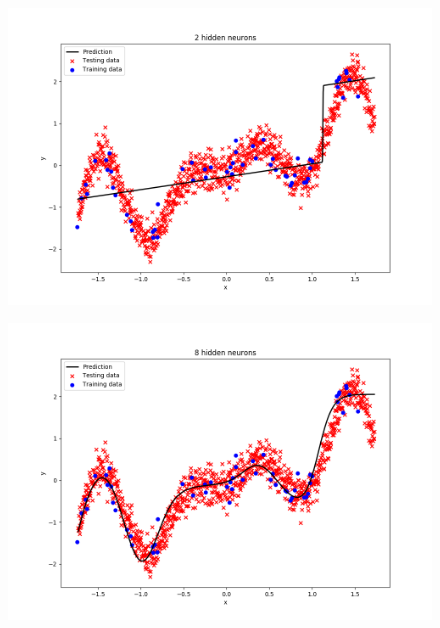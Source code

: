 \documentclass[a4paper]{article}
\begin{document}
\begin{enumerate}[label=(\alph*)]
\begin{figure}[htp]
\begin{minipage}{0.4\textwidth}
  \includegraphics[scale=0.35]{plots/11a_2.png}
  \label{plot_simple_nh2}
\end{minipage}
\hfill
\begin{minipage}{0.4\textwidth}
  \includegraphics[scale=0.35]{plots/11a_8.png}
  \label{plot_simple_nh8}
\end{minipage}
\end{figure}


\end{enumerate}
\end{document}
